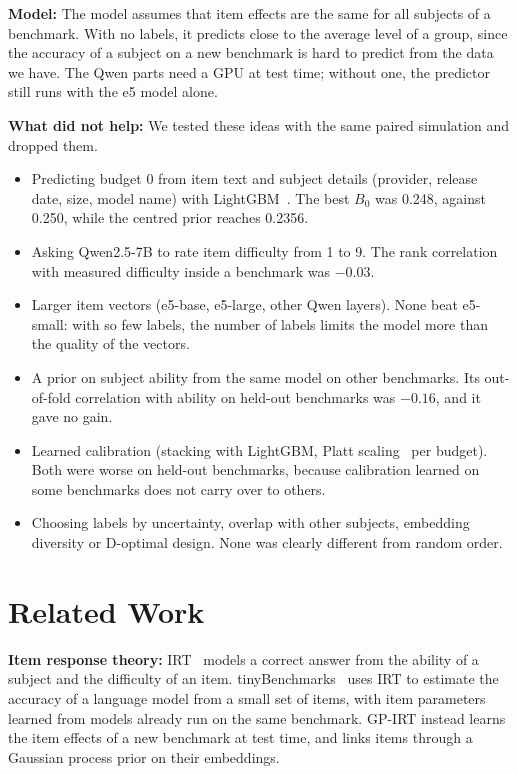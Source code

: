 \documentclass{article}
\begin{document}
\textbf{Model:} The model assumes that item effects are the same for all subjects of a benchmark. With no labels, it
predicts close to the average level of a group, since the accuracy of a subject on a new benchmark is hard to predict
from the data we have. The Qwen parts need a GPU at test time; without one, the predictor still runs with the e5 model
alone.

\textbf{What did not help:} We tested these ideas with the same paired simulation and dropped them.
\begin{itemize}\itemsep0pt
\item Predicting budget 0 from item text and subject details (provider, release date, size, model name) with
LightGBM~\citep{ke2017lightgbm}. The best $B_0$ was 0.248, against 0.250, while the centred prior reaches 0.2356.
\item Asking Qwen2.5-7B to rate item difficulty from 1 to 9. The rank correlation with measured difficulty inside a
benchmark was $-0.03$.
\item Larger item vectors (e5-base, e5-large, other Qwen layers). None beat e5-small: with so few labels, the number of
labels limits the model more than the quality of the vectors.
\item A prior on subject ability from the same model on other benchmarks. Its out-of-fold correlation with ability on
held-out benchmarks was $-0.16$, and it gave no gain.
\item Learned calibration (stacking with LightGBM, Platt scaling~\citep{platt2000probabilities} per budget). Both were
worse on held-out benchmarks, because calibration learned on some benchmarks does not carry over to others.
\item Choosing labels by uncertainty, overlap with other subjects, embedding diversity or D-optimal design. None was
clearly different from random order.
\end{itemize}

\section{Related Work}
\textbf{Item response theory:} IRT~\citep{lord2012applications} models a correct answer from the ability of a subject
and the difficulty of an item. tinyBenchmarks~\citep{polo2024tinybenchmarks} uses IRT to estimate the accuracy of a
language model from a small set of items, with item parameters learned from models already run on the same benchmark.
GP-IRT instead learns the item effects of a new benchmark at test time, and links items through a Gaussian process
prior on their embeddings.
\end{document}
